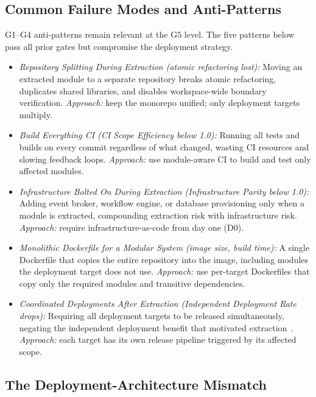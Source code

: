 \subsection*{Common Failure Modes and Anti-Patterns}

G1--G4 anti-patterns remain relevant at the G5 level. The five patterns below pass all prior gates but compromise the deployment strategy.

\begin{itemize}[itemsep=8pt,topsep=2pt]
  \item \emph{Repository Splitting During Extraction (atomic refactoring lost):}
  Moving an extracted module to a separate repository breaks atomic refactoring, duplicates shared libraries, and disables workspace-wide boundary verification.
  \emph{Approach:} keep the monorepo unified; only deployment targets multiply.

  \item \emph{Build Everything CI (CI Scope Efficiency below 1.0):}
  Running all tests and builds on every commit regardless of what changed, wasting CI resources and slowing feedback loops.
  \emph{Approach:} use module-aware CI to build and test only affected modules.

  \item \emph{Infrastructure Bolted On During Extraction (Infrastructure Parity below 1.0):}
  Adding event broker, workflow engine, or database provisioning only when a module is extracted, compounding extraction risk with infrastructure risk.
  \emph{Approach:} require infrastructure-as-code from day one (D0).

  \item \emph{Monolithic Dockerfile for a Modular System (image size, build time):}
  A single Dockerfile that copies the entire repository into the image, including modules the deployment target does not use.
  \emph{Approach:} use per-target Dockerfiles that copy only the required modules and transitive dependencies.

  \item \emph{Coordinated Deployments After Extraction (Independent Deployment Rate drops):}
  Requiring all deployment targets to be released simultaneously, negating the independent deployment benefit that motivated extraction~\cite{richardson2018microservices,newman2019monolith}.
  \emph{Approach:} each target has its own release pipeline triggered by its affected scope.
\end{itemize}


\subsection*{The Deployment-Architecture Mismatch}
\label{sec:g5-deployment-mismatch}

